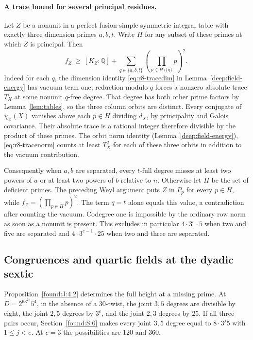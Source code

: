 \documentclass[11pt,a4paper]{article}
\numberwithin{equation}{section}
\theoremstyle{remark}
\begin{document}
\paragraph{A trace bound for several principal residues.}
Let $Z$ be a nonunit in a perfect fusion-simple symmetric integral
table with exactly three dimension primes $a,b,t$. Write $H$ for any
subset of these primes at which $Z$ is principal. Then
\[
 f_Z\ \ge\ [K_Z:\mathbb Q]+
 \sum_{q\in\{a,b,t\}}\left(\prod_{p\in H\setminus\{q\}}p\right)^2.
\]
Indeed for each $q$, the dimension identity \eqref{eq:r8-tracedim} in Lemma~\ref{deep:field-energy} has vacuum term one; reduction modulo $q$
forces a nonzero absolute trace $T_X$ at some nonunit $q$-free degree.
That degree has both other prime factors by Lemma~\ref{lem:tables}, so the
three column orbits are distinct. Every conjugate of $\chi_Z(X)$
vanishes above each $p\in H$ dividing $d_X$, by principality and
Galois covariance. Their absolute trace is a rational integer
therefore divisible by the product of these primes. The orbit norm
identity (Lemma~\ref{deep:field-energy}), \eqref{eq:r8-tracenorm} counts at least $T_X^2$ for each of
these three orbits in addition to the vacuum contribution.

Consequently when $a,b$ are separated, every $t$-full degree misses
at least two powers of $a$ or at least two powers of $b$ relative to
$n$. Otherwise let $H$ be the set of deficient primes. The preceding
Weyl argument puts $Z$ in $P_p$ for every $p\in H$, while
$f_Z=(\prod_{p\in H}p)^2$. The term $q=t$ alone equals this value,
a contradiction after counting the vacuum. Codegree one is impossible
by the ordinary row norm as soon as a nonunit is present. This excludes
in particular $4\cdot3^e\cdot5$ when two and five are separated and
$4\cdot3^{e-1}\cdot25$ when two and three are separated.

\subsection{Congruences and quartic fields at the dyadic sextic}\label{sec:dyadic-fields}

Proposition~\ref{found:J:4.2} determines the full height at a missing prime. At $D=2^63^{2e}5^4$, in
the absence of a $30$-twist, the joint $3,5$ degrees are divisible
by eight, the joint $2,5$ degrees by $3^e$, and the joint $2,3$
degrees by $25$. If all three pairs occur, Section~\ref{found:S:6} makes
every joint $3,5$ degree equal to $8\cdot3^j5$ with $1\le j<e$.
At $e=3$ the possibilities are $120$ and $360$.
\end{document}
